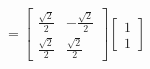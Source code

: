 \documentclass[preview]{standalone}
\begin{document}
\begin{align*}
=\begin{bmatrix}\frac{\sqrt{2}}{2}&-\frac{\sqrt{2}}{2}\\\frac{\sqrt{2}}{2}&\frac{\sqrt{2}}{2}\end{bmatrix}\begin{bmatrix}1\\1\end{bmatrix}
\end{align*}
\end{document}
